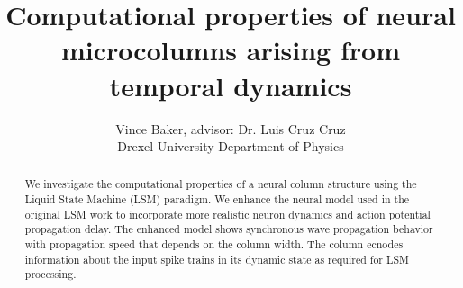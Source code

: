\documentclass[a4paper,11pt]{article}
\title{Computational properties of neural microcolumns arising from temporal dynamics}
\author{Vince Baker, advisor: Dr. Luis Cruz Cruz\\ Drexel University Department of Physics}
\begin{document}
\maketitle

\begin{abstract}
We investigate the computational properties of a neural column structure using the Liquid State Machine (LSM) paradigm.
We enhance the neural model used in the original LSM work to incorporate more realistic neuron dynamics and action potential propagation delay.
The enhanced model shows synchronous wave propagation behavior with propagation speed that depends on the column width. 
The column ecnodes information about the input spike trains in its dynamic state as required for LSM processing.

\end{abstract}
\end{document}
